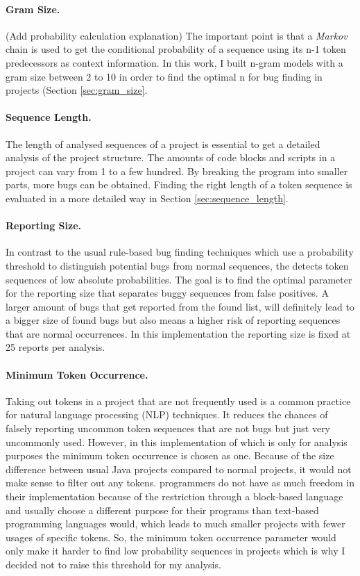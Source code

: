 \paragraph{Gram Size.}
(Add probability calculation explanation) The important point is that a \emph{Markov} chain is used to get the conditional probability of a sequence using its n-1 token predecessors as context information. In this work, I built n-gram models with a gram size between 2 to 10 in order to find the optimal n for bug finding in \scratch{} projects (Section \ref{sec:gram_size}. 
\paragraph{Sequence Length.}
The length of analysed sequences of a project is essential to get a detailed analysis of the project structure. The amounts of code blocks and scripts in a \scratch{} project can vary from 1 to a few hundred. By breaking the program into smaller parts, more bugs can be obtained. Finding the right length of a token sequence is evaluated in a more detailed way in Section \ref{sec:sequence_length}.
\paragraph{Reporting Size.}
In contrast to the usual rule-based bug finding techniques which use a probability threshold to distinguish potential bugs from normal sequences, the \ngram{} detects token sequences of low absolute probabilities. The goal is to find the optimal parameter for the reporting size that separates buggy sequences from false positives. A larger amount of bugs that get reported from the found list, will definitely lead to a bigger size of found bugs but also means a higher risk of reporting sequences that are normal occurrences. In this implementation the reporting size is fixed at 25 reports per analysis.
\paragraph{Minimum Token Occurrence.}
Taking out tokens in a project that are not frequently used is a common practice for natural language processing (NLP) techniques. It reduces the chances of falsely reporting uncommon token sequences that are not bugs but just very uncommonly used. However, in this implementation of \ngram{} which is only for \scratch{} analysis purposes the minimum token occurrence is chosen as one. Because of the size difference between usual Java projects compared to normal \scratch{} projects, it would not make sense to filter out any tokens. \scratch{} programmers do not have as much freedom in their implementation because of the restriction through a block-based language and usually choose a different purpose for their programs than text-based programming languages would, which leads to much smaller projects with fewer usages of specific tokens. So, the minimum token occurrence parameter would only make it harder to find low probability sequences in projects which is why I decided not to raise this threshold for my analysis.

